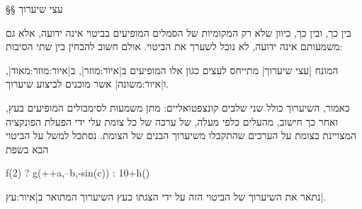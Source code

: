 §§ עצי שיערוך

בין כך, ובין כך, כיוון שלא רק המקומיות של הסמלים המופיעים בביטוי אינה ידועה,
אלא גם משמעותם אינה ידועה, לא נוכל לשערך את הביטוי. אולם חשוב להבחין בין שתי
הסיבות:

המונח \ע|עצי שיערוך|
מתייחס לעצים כגון אלו המופיעים ב|איור:מוזר|, ב|איור:מוזר:מאוד|, ו|איור:משונה| אשר
 מוכנים לביצוע שיערוך.

 כאמור, השיערוך כולל שני שלבים קונצפטואליים: מתן משמעות לסימבולים המופיעים בעץ,
 ואחר כך חישוב, מהעלים כלפי מעלה, של ערכה של כל צומת עלי ידי הפעלת הפונקציה
 המצויינת בצומת על הערכים שהתקבלו משיערוך הבנים של הצומת. נסתכל למשל על הביטוי
 הבא בשפת~\CPL
 \begin{CPP}
  f(2) ? g(++a,--b,-sin(c)) : 10+h()
\end{CPP}
 נתאר את השיערוך של הביטוי הזה על ידי הצגתו כעץ השיערוך המתואר ב|איור:עץ|.

